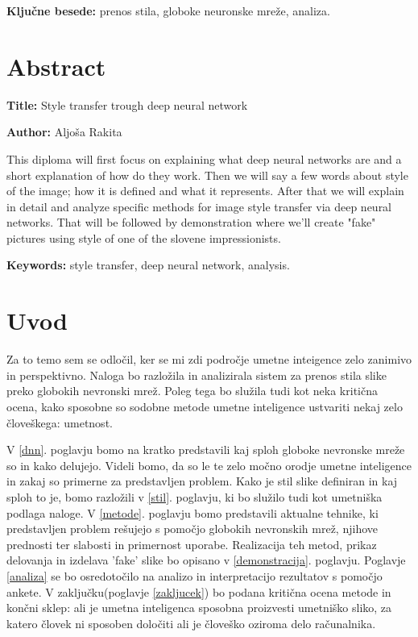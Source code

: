 \documentclass[a4paper, 12pt]{book}
\newcommand{\ttitleEn}{Style transfer trough deep neural network}
\newcommand{\tauthor}{Aljoša Rakita}
\newcommand{\tkeywords}{prenos stila, globoke neuronske mreže, analiza}
\newcommand{\tkeywordsEn}{style transfer, deep neural network, analysis}
\newcommand{\clearemptydoublepage}{\newpage{\pagestyle{empty}\cleardoublepage}}
\begin{document}
\noindent\textbf{Ključne besede:} \tkeywords.
\clearemptydoublepage

\chapter*{Abstract}

\noindent\textbf{Title:} \ttitleEn
\bigskip

\noindent\textbf{Author:} \tauthor
\bigskip

\noindent This diploma will first focus on explaining what deep neural networks are and a short explanation of how do they work. Then we will say a few words about style of the image; how it is defined and what it represents. After that we will explain in detail and analyze specific methods for image style transfer via deep neural networks. That will be followed by demonstration where we'll create "fake" pictures using style of one of the slovene impressionists.
\bigskip

\noindent\textbf{Keywords:} \tkeywordsEn.
\clearemptydoublepage

\mainmatter
\setcounter{page}{1}
\pagestyle{fancy}

\chapter{Uvod}

Za to temo sem se odločil, ker se mi zdi področje umetne inteigence zelo zanimivo in perspektivno. Naloga bo razložila in analizirala sistem za prenos stila slike preko globokih nevronski mrež. Poleg tega bo služila tudi kot neka kritična ocena, kako sposobne so sodobne metode umetne inteligence ustvariti nekaj zelo človeškega: umetnost. 


V \ref{dnn}. poglavju bomo na kratko predstavili kaj sploh globoke nevronske mreže so in kako delujejo. Videli bomo, da so le te zelo močno orodje umetne inteligence in zakaj so primerne za predstavljen problem.
Kako je stil slike definiran in kaj sploh to je, bomo razložili v \ref{stil}. poglavju, ki bo služilo tudi kot umetniška podlaga naloge.
V \ref{metode}. poglavju bomo predstavili aktualne tehnike, ki predstavljen problem rešujejo s pomočjo globokih nevronskih mrež, njihove prednosti ter slabosti in primernost uporabe. Realizacija teh metod, prikaz delovanja in izdelava 'fake' slike bo opisano v \ref{demonstracija}. poglavju. Poglavje \ref{analiza} se bo osredotočilo na analizo in interpretacijo rezultatov s pomočjo ankete.
V zaključku(poglavje \ref{zakljucek}) bo podana kritična ocena metode in končni sklep: ali je umetna inteligenca sposobna proizvesti umetniško sliko, za katero človek ni sposoben določiti ali je človeško oziroma delo računalnika.
\end{document}
